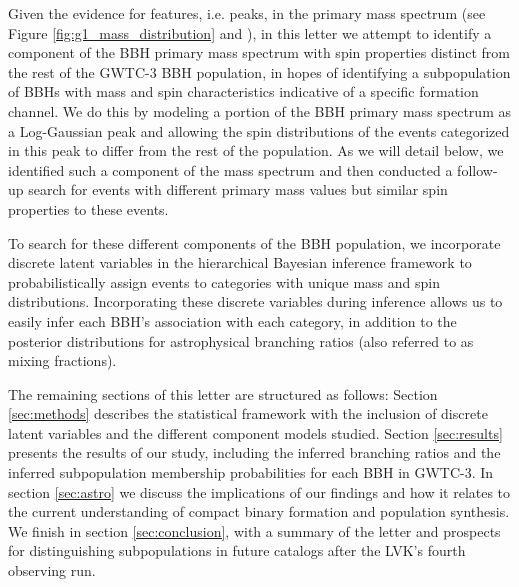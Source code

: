 Given the evidence for features, i.e. peaks, in the primary mass spectrum (see Figure \ref{fig:g1_mass_distribution} and \citet{2111.03634, 2022ApJ...928..155T, 10.3847/2041-8213/aa9bf6, 10.3847/1538-4357/aab34c, 10.3847/2041-8213/ab3800, 2021ApJ...913L...7A}), in this letter we attempt to identify a component of the BBH primary mass spectrum with spin properties distinct from the rest of the GWTC-3 BBH population, in hopes of identifying a subpopulation of BBHs with mass and spin characteristics indicative of a specific formation channel. We do this by modeling a portion of the BBH primary mass spectrum as a Log-Gaussian peak and allowing the spin distributions of the events categorized in this peak to differ from the rest of the population. As we will detail below, we identified such a component of the mass spectrum and then conducted a follow-up search for events with different primary mass values but similar spin properties to these events.

To search for these different components of the BBH population, we incorporate discrete latent variables in the hierarchical Bayesian inference framework to probabilistically assign events to categories with unique mass and spin distributions. Incorporating these discrete variables during inference allows us to easily infer each BBH's association with each category, in addition to the posterior distributions for astrophysical branching ratios (also referred to as mixing fractions).

The remaining sections of this letter are structured as follows: Section \ref{sec:methods} describes the statistical framework with the inclusion of discrete latent variables and the different component models studied. Section \ref{sec:results} presents the results of our study, including the inferred branching ratios and the inferred subpopulation membership probabilities for each BBH in GWTC-3. In section \ref{sec:astro} we discuss the implications of our findings and how it relates to the current understanding of compact binary formation and population synthesis. We finish in section \ref{sec:conclusion}, with a summary of the letter and prospects for distinguishing subpopulations in future catalogs after the LVK's fourth observing run. 